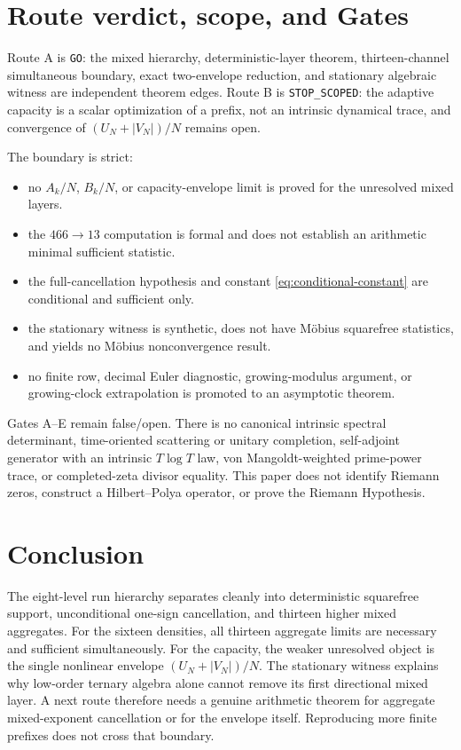 \documentclass[11pt]{article}
\theoremstyle{definition}
\theoremstyle{remark}
\begin{document}
\section{Route verdict, scope, and Gates}

Route A is \texttt{GO}: the mixed hierarchy, deterministic-layer theorem,
thirteen-channel simultaneous boundary, exact two-envelope reduction, and
stationary algebraic witness are independent theorem edges.  Route B is
\texttt{STOP\_SCOPED}: the adaptive capacity is a scalar optimization of a
prefix, not an intrinsic dynamical trace, and convergence of
$(U_N+|V_N|)/N$ remains open.

The boundary is strict:
\begin{itemize}[leftmargin=*]
\item no $A_k/N$, $B_k/N$, or capacity-envelope limit is proved for the
      unresolved mixed layers.
\item the $466\to13$ computation is formal and does not establish an
      arithmetic minimal sufficient statistic.
\item the full-cancellation hypothesis and constant
      \eqref{eq:conditional-constant} are conditional and sufficient only.
\item the stationary witness is synthetic, does not have M\"obius
      squarefree statistics, and yields no M\"obius nonconvergence result.
\item no finite row, decimal Euler diagnostic, growing-modulus argument, or
      growing-clock extrapolation is promoted to an asymptotic theorem.
\end{itemize}

Gates A--E remain false/open.  There is no canonical intrinsic spectral
determinant, time-oriented scattering or unitary completion, self-adjoint
generator with an intrinsic $T\log T$ law, von Mangoldt-weighted prime-power
trace, or completed-zeta divisor equality.  This paper does not identify
Riemann zeros, construct a Hilbert--Polya operator, or prove the Riemann
Hypothesis.

\section{Conclusion}

The eight-level run hierarchy separates cleanly into deterministic
squarefree support, unconditional one-sign cancellation, and thirteen
higher mixed aggregates.  For the sixteen densities, all thirteen
aggregate limits are necessary and sufficient simultaneously.  For the
capacity, the weaker unresolved object is the single nonlinear envelope
$(U_N+|V_N|)/N$.  The stationary witness explains why low-order ternary
algebra alone cannot remove its first directional mixed layer.  A next
route therefore needs a genuine arithmetic theorem for aggregate
mixed-exponent cancellation or for the envelope itself.  Reproducing more
finite prefixes does not cross that boundary.
\end{document}
